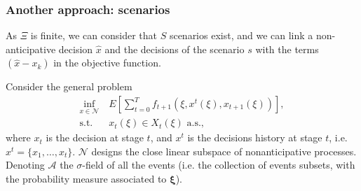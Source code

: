 \documentclass[french]{beamer}
\def\bxi{\boldsymbol\xi}
\begin{document}
\begin{frame}

\frametitle{Another approach: scenarios}

As $\Xi$ is finite, we can consider that $S$ scenarios exist, and we can link a non-anticipative decision $\hat{x}$ and the decisions of the scenario $s$ with the terms $(\hat{x}-x_k)$ in the objective function.

\mbox{}

Consider the general problem
\begin{align*}
\inf_{x \in \mathcal{N}}\ & E \left[ \sum_{t=0}^T f_{t+1}(\xi, x^t(\xi),
x_{t+1}(\xi)) \right], \\
\mbox{s.t. } & x_t(\xi) \in X_t(\xi) \mbox{ a.s.},
\end{align*}
where $x_t$ is the decision at stage $t$, and $x^t$ is the decisions history at stage $t$, i.e. $x^t = \lbrace x_1,\ldots, x_t \rbrace$.
$\mathcal{N}$ designs the close linear subspace of nonanticipative processes.
Denoting $\mathcal{A}$ the $\sigma$-field of all the events (i.e. the collection of events subsets, with the probability measure associated to $\bxi$).

\end{frame}
\end{document}
